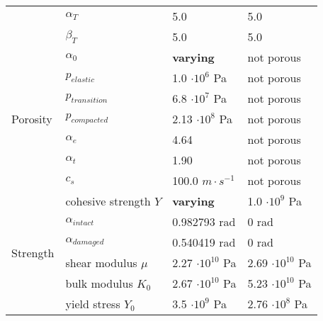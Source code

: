 \begin{table}
\begin{tabular}{ |l|l|l|l| }
                                              & $\alpha_T$            & 5.0                              & 5.0                              \\
                                              & $\beta_T$             & 5.0                              & 5.0                              \\ \hline
        \multirow{7}{*}{Porosity}             & $\alpha_0$            & \textbf{varying}                 & not porous                       \\
                                              & $p_{elastic}$         & 1.0 $\cdot 10^6$ Pa              & not porous                       \\
                                              & $p_{transition}$      & 6.8 $\cdot 10^7$ Pa              & not porous                       \\
                                              & $p_{compacted}$       & 2.13 $\cdot 10^8$ Pa             & not porous                       \\
                                              & $\alpha_e$            & 4.64                             & not porous                       \\
                                              & $\alpha_t$            & 1.90                             & not porous                       \\
                                              & $c_s$                 & 100.0 $m\cdot s^{-1}$            & not porous                       \\ \hline
        \multirow{6}{*}{Strength}             & cohesive strength $Y$ & \textbf{varying}                 & 1.0 $\cdot 10^9$ Pa              \\
                                              & $\alpha_{intact}$     & 0.982793 rad                     & 0 rad                            \\
                                              & $\alpha_{damaged}$    & 0.540419 rad                     & 0 rad                            \\
                                              & shear modulus $\mu$   & 2.27 $\cdot 10^{10}$ Pa          & 2.69 $\cdot 10^{10}$ Pa          \\
                                              & bulk modulus $K_0$    & 2.67 $\cdot 10^{10}$ Pa          & 5.23 $\cdot 10^{10}$ Pa          \\
                                              & yield stress $Y_0$    & 3.5 $\cdot 10^9$ Pa              & 2.76 $\cdot 10^8$ Pa             \\ \hline

\end{tabular}
\end{table}
